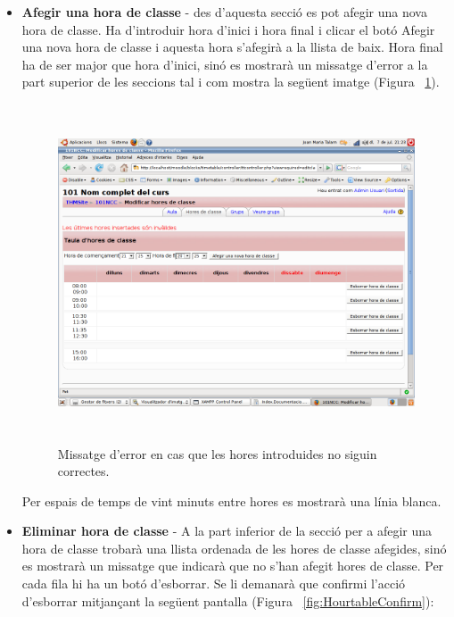 \documentclass[a4paper]{report}  %
\begin{document}
\begin{itemize}
\item\textbf{Afegir una hora de classe} - des d'aquesta secció es pot afegir una nova hora de classe.
Ha d'introduir hora d'inici i hora final i clicar el botó Afegir una nova hora de classe i aquesta hora s'afegirà a la llista de baix.
Hora final ha de ser major que hora d'inici, sinó es mostrarà un missatge d'error a la part superior de les seccions tal i com mostra la següent imatge (Figura ~\ref{fig:HourtableError}).
		\begin{figure}[H] %
		\begin{center}
		\includegraphics[height=10cm,width=12cm]{img/HourtableError.png}
		\caption[List caption]{Missatge d'error en cas que les hores introduides no siguin correctes.}
		\label{fig:HourtableError}
		\end{center}
		\end{figure}
Per espais de temps de vint minuts entre hores es mostrarà una línia blanca.
\item\textbf{Eliminar hora de classe} - A la part inferior de la secció per a afegir una hora de classe trobarà una llista ordenada de les hores de classe afegides, sinó es mostrarà un missatge que indicarà que no s'han afegit hores de classe.
Per cada fila hi ha un botó d'esborrar. Se li demanarà que confirmi l'acció d'esborrar mitjançant la següent pantalla (Figura ~\ref{fig:HourtableConfirm}):
		\begin{figure}[H] %
		\begin{center}

\end{center}
\end{figure}
\end{itemize}
\end{document}
